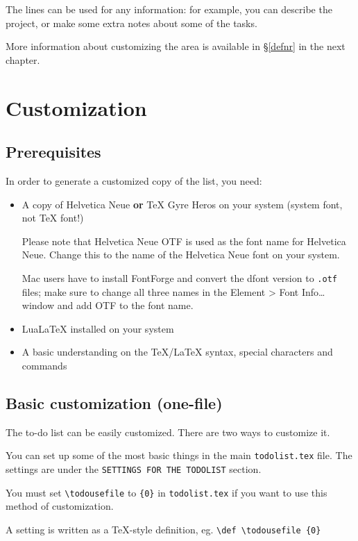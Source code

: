 \documentclass[a4paper,english]{report}
\numberwithin{equation}{section}
\newcommand{\ltcs}[1]{\texttt{\textbackslash#1}}
\begin{document}
The lines can be used for any information: for example, you can describe the project, or make some extra notes about some of the tasks.

More information about customizing the area is available in §\ref{defnr} in the next chapter.

\chapter{Customization}
\label{customization}
\section{Prerequisites}

In order to generate a customized copy of the list, you need:

\begin{itemize}
\item A copy of Helvetica Neue \textbf{or} \TeX{} Gyre Heros on your system (system font, not \TeX{} font!)

Please note that \textsf{Helvetica Neue OTF} is used as the font name for Helvetica Neue. Change this to the name of the Helvetica Neue font on your system.

Mac users have to install FontForge and convert the dfont version to \texttt{.otf} files; make sure to change all three names in the \textsf{Element > Font Info…} window and add \textsf{OTF} to the font name.

\item Lua\LaTeX{} installed on your system
\item A basic understanding on the \TeX{}/\LaTeX{} syntax, special characters and commands
\end{itemize}

\section{Basic customization (one-file)}
\label{basic}

The to-do list can be easily customized.  There are two ways to customize it.

You can set up some of the most basic things in the main \texttt{todolist.tex} file.  The settings are under the \texttt{SETTINGS FOR THE TODOLIST} section.

You must set \ltcs{todousefile} to \texttt{\{0\}} in \texttt{todolist.tex} if you want to use this method of customization.

A setting is written as a \TeX-style definition, eg. \texttt{\ltcs{def} \ltcs{todousefile} \{0\}}
\end{document}

